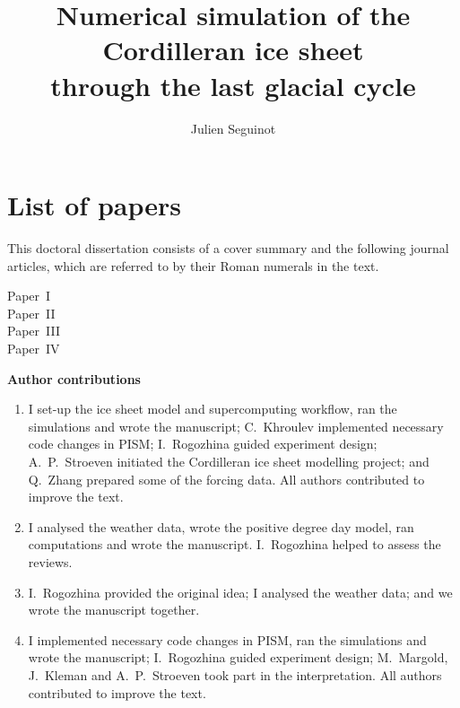 \documentclass{article}
\title{Numerical simulation of the Cordilleran ice sheet \\
       through the last glacial cycle}
\author{Julien Seguinot}
\newcommand{\CCLI}[0]{Paper~I}      %
\newcommand{\PSDV}[0]{Paper~II}     %
\newcommand{\PSDP}[0]{Paper~III}    %
\newcommand{\CCYC}[0]{Paper~IV}     %
\begin{document}

\section*{List of papers}

This doctoral dissertation consists of a cover summary and the following
journal articles, which are referred to by their Roman numerals in the text.

\begin{description}
  \item[\CCLI] 
  \item[\PSDV] 
  \item[\PSDP] 
  \item[\CCYC] 
\end{description}

\vfill
\noindent\textbf{Author contributions}

\small{\begin{enumerate}
  \item[I] I set-up the ice sheet model and supercomputing workflow, ran the
simulations and wrote the manuscript; C.~Khroulev implemented necessary code
changes in PISM; I.~Rogozhina guided experiment design; A.~P.~Stroeven
initiated the Cordilleran ice sheet modelling project; and Q.~Zhang prepared
some of the forcing data. All authors contributed to improve the text.
  \item[II] I analysed the weather data, wrote the positive degree day model,
ran computations and wrote the manuscript. I.~Rogozhina helped to assess the
reviews.
  \item[III] I.~Rogozhina provided the original idea; I analysed the weather
data; and we wrote the manuscript together.
  \item[IV] I implemented necessary code changes in PISM, ran the simulations
and wrote the manuscript; I.~Rogozhina guided experiment design; M.~Margold,
J.~Kleman and A.~P.~Stroeven took part in the interpretation. All authors
contributed to improve the text.
\end{enumerate}}

\newpage
\maketitle
\tableofcontents
\newpage
\end{document}

